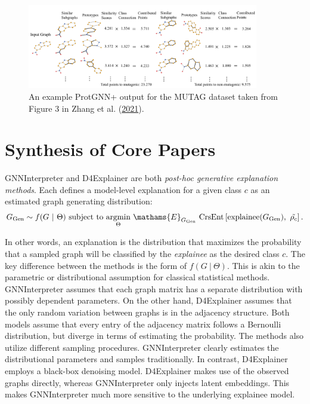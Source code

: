 \documentclass[
  11pt,
  letterpaper,
]{article}
\begin{document}
\begin{figure}

{\centering \includegraphics[width=0.9\textwidth,height=\textheight]{figures/prot_inference_ex.png}

}

\caption{\label{fig-prot-diagram}An example ProtGNN+ output for the
MUTAG dataset taken from Figure 3 in Zhang et al.
(\protect\hyperlink{ref-Zhang_Liu_Wang_Lu_Lee_2021}{2021}).}

\end{figure}

\hypertarget{synthesis-of-core-papers}{%
\section{Synthesis of Core Papers}\label{synthesis-of-core-papers}}

\quad GNNInterpreter and D4Explainer are both \emph{post-hoc generative
explanation methods}. Each defines a model-level explanation for a given
class \(c\) as an estimated graph generating distribution:\\
\begin{equation}
    G_\text{Gen} \sim f(G \ | \ \Theta) \text{ subject to } \underset{\Theta}{\text{argmin}}\ \mathams{E}_{G_\text{Gen}} \ \text{CrsEnt}\left[\text{explainee}(G_\text{Gen}), \ \tilde{\rho_c}\right].
\end{equation}

In other words, an explanation is the distribution that maximizes the
probability that a sampled graph will be classified by the
\emph{explainee} as the desired class \(c\). The key difference between
the methods is the form of \(f(G \ | \ \Theta)\). This is akin to the
parametric or distributional assumption for classical statistical
methods. GNNInterpreter assumes that each graph matrix has a separate
distribution with possibly dependent parameters. On the other hand,
D4Explainer assumes that the only random variation between graphs is in
the adjacency structure. Both models assume that every entry of the
adjacency matrix follows a Bernoulli distribution, but diverge in terms
of estimating the probability. The methods also utilize different
sampling procedures. GNNInterpreter clearly estimates the distributional
parameters and samples traditionally. In contrast, D4Explainer employs a
black-box denoising model. D4Explainer makes use of the observed graphs
directly, whereas GNNInterpreter only injects latent embeddings. This
makes GNNInterpreter much more sensitive to the underlying explainee
model.
\end{document}
